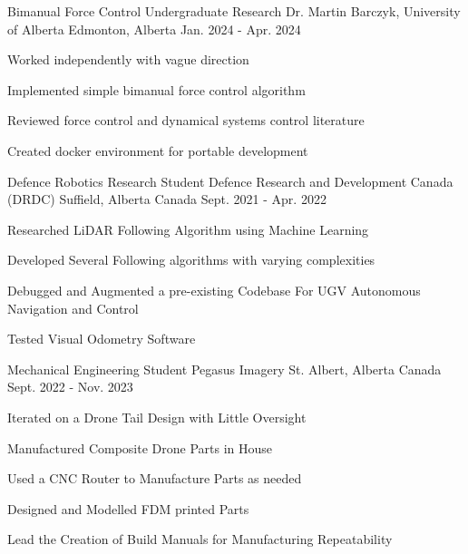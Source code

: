 

\begin{cventries}
  
\cventry
{Bimanual Force Control Undergraduate Research} %
{Dr. Martin Barczyk, University of Alberta} %
{Edmonton, Alberta} %
{Jan. 2024 - Apr. 2024} %
{
  \begin{cvitems} %
    \item Worked independently with vague direction
    \item Implemented simple bimanual force control algorithm
    \item Reviewed force control and dynamical systems control literature
    \item Created docker environment for portable development
  \end{cvitems}
}

  \cventry
    {Defence Robotics Research Student} %
    {Defence Research and Development Canada (DRDC)} %
    {Suffield, Alberta Canada} %
    {Sept. 2021 - Apr. 2022} %
    {
      \begin{cvitems} %
        \item Researched LiDAR  Following Algorithm using Machine Learning
        \item Developed Several Following algorithms with varying complexities
        \item Debugged and Augmented a pre-existing Codebase For UGV Autonomous Navigation and Control
        \item Tested Visual Odometry Software
      \end{cvitems}
    }

\cventry
{Mechanical Engineering Student} %
{Pegasus Imagery} %
{St. Albert, Alberta Canada} %
{Sept. 2022 - Nov. 2023} %
{
  \begin{cvitems} %
    \item Iterated on a Drone Tail Design with Little Oversight
    \item Manufactured Composite Drone Parts in House
    \item Used a CNC Router to Manufacture Parts as needed
    \item Designed and Modelled FDM printed Parts
    \item Lead the Creation of Build Manuals for Manufacturing Repeatability
  \end{cvitems}
}







\end{cventries}
